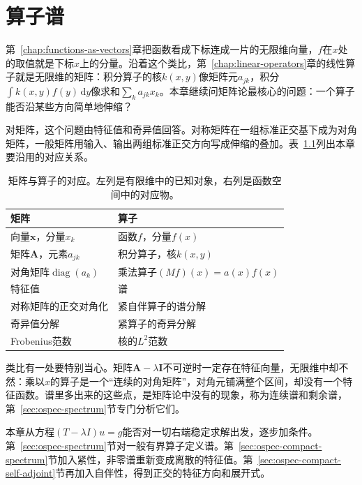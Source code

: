 \chapter{算子谱}
\label{chap:operator-spectra}
\label{chap:operator-spectra-equations}

第~\ref{chap:functions-as-vectors}章把函数看成下标连成一片的无限维向量，$f$在$x$处的取值就是下标$x$上的分量。沿着这个类比，第~\ref{chap:linear-operators}章的线性算子就是无限维的矩阵：积分算子的核$k(x,y)$像矩阵元$a_{jk}$，积分$\int k(x,y)f(y)\,\mathrm dy$像求和$\sum_k a_{jk}x_k$。本章继续问矩阵论最核心的问题：一个算子能否沿某些方向简单地伸缩？

对矩阵，这个问题由特征值和奇异值回答。对称矩阵在一组标准正交基下成为对角矩阵，一般矩阵用输入、输出两组标准正交方向写成伸缩的叠加。表~\ref{tab:ospec-dictionary}列出本章要沿用的对应关系。

\begin{table}[!htb]
  \centering
  \caption{矩阵与算子的对应。左列是有限维中的已知对象，右列是函数空间中的对应物。}
  \label{tab:ospec-dictionary}
  \begin{tabular}{@{}ll@{}}
    \toprule
    矩阵 & 算子\\
    \midrule
    向量$\bm x$，分量$x_k$ & 函数$f$，分量$f(x)$\\
    矩阵$\bm A$，元素$a_{jk}$ & 积分算子，核$k(x,y)$\\
    对角矩阵$\operatorname{diag}(a_k)$ & 乘法算子$(Mf)(x)=a(x)f(x)$\\
    特征值 & 谱\\
    对称矩阵的正交对角化 & 紧自伴算子的谱分解\\
    奇异值分解 & 紧算子的奇异分解\\
    Frobenius范数 & 核的$L^2$范数\\
    \bottomrule
  \end{tabular}
\end{table}

类比有一处要特别当心。矩阵$\bm A-\lambda\bm I$不可逆时一定存在特征向量，无限维中却不然：乘以$x$的算子是一个“连续的对角矩阵”，对角元铺满整个区间，却没有一个特征函数。谱里多出来的这些点，是矩阵论中没有的现象，称为连续谱和剩余谱，第~\ref{sec:ospec-spectrum}节专门分析它们。

本章从方程$(T-\lambda I)u=g$能否对一切右端稳定求解出发，逐步加条件。第~\ref{sec:ospec-spectrum}节对一般有界算子定义谱。第~\ref{sec:ospec-compact-spectrum}节加入紧性，非零谱重新变成离散的特征值。第~\ref{sec:ospec-compact-self-adjoint}节再加入自伴性，得到正交的特征方向和展开式。

